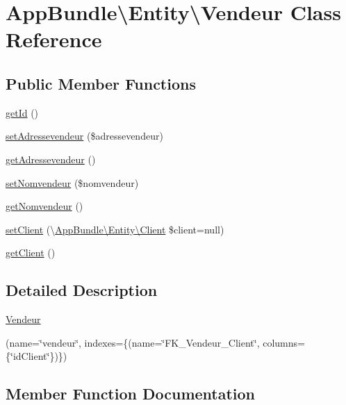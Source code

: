 \hypertarget{class_app_bundle_1_1_entity_1_1_vendeur}{}\section{App\+Bundle\textbackslash{}Entity\textbackslash{}Vendeur Class Reference}
\label{class_app_bundle_1_1_entity_1_1_vendeur}
\subsection*{Public Member Functions}
\begin{DoxyCompactItemize}
\item 
\hyperlink{class_app_bundle_1_1_entity_1_1_vendeur_af33560a6e636353a11f69ea0de5ca60f}{get\+Id} ()
\item 
\hyperlink{class_app_bundle_1_1_entity_1_1_vendeur_a50733d9a3a483e8a7d7f0fa2aeb33dd4}{set\+Adressevendeur} (\$adressevendeur)
\item 
\hyperlink{class_app_bundle_1_1_entity_1_1_vendeur_ae9535f88322f20b26e1cd1a3df7e74db}{get\+Adressevendeur} ()
\item 
\hyperlink{class_app_bundle_1_1_entity_1_1_vendeur_a8d691e2b5b4ca91b539807b63db0eb51}{set\+Nomvendeur} (\$nomvendeur)
\item 
\hyperlink{class_app_bundle_1_1_entity_1_1_vendeur_a92ace41c5123e5539d4f4ea86ab7b074}{get\+Nomvendeur} ()
\item 
\hyperlink{class_app_bundle_1_1_entity_1_1_vendeur_a07bbf95dfb3159369f49711e8e64114f}{set\+Client} (\textbackslash{}\hyperlink{class_app_bundle_1_1_entity_1_1_client}{App\+Bundle\textbackslash{}\+Entity\textbackslash{}\+Client} \$client=null)
\item 
\hyperlink{class_app_bundle_1_1_entity_1_1_vendeur_ae508685e30ee4ae9659efba6a2d5a071}{get\+Client} ()
\end{DoxyCompactItemize}


\subsection{Detailed Description}
\hyperlink{class_app_bundle_1_1_entity_1_1_vendeur}{Vendeur}

(name=\char`\"{}vendeur\char`\"{}, indexes=\{(name=\char`\"{}\+F\+K\+\_\+\+Vendeur\+\_\+\+Client\char`\"{}, columns=\{\char`\"{}id\+Client\char`\"{}\})\})  

\subsection{Member Function Documentation}
\mbox{\label{class_app_bundle_1_1_entity_1_1_vendeur_ae9535f88322f20b26e1cd1a3df7e74db}} 

